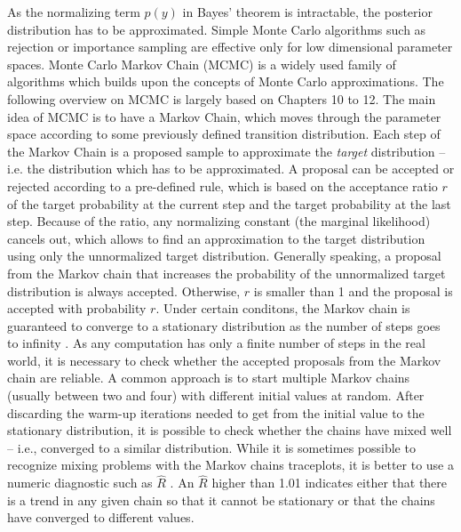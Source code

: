 As the normalizing term $p(y)$ in Bayes' theorem is intractable, the posterior distribution has to be approximated.
Simple Monte Carlo algorithms such as rejection or importance sampling are effective only for low dimensional parameter spaces.
Monte Carlo Markov Chain (MCMC) is a widely used family of algorithms which builds upon the concepts of Monte Carlo approximations.
The following overview on MCMC is largely based on \cite{gelman_bayesian_2014} Chapters 10 to 12.
The main idea of MCMC is to have a Markov Chain, which moves through the parameter space according to some previously defined transition distribution.
Each step of the Markov Chain is a proposed sample to approximate the \textit{target} distribution – i.e. the distribution which has to be approximated.
A proposal can be accepted or rejected according to a pre-defined rule, which is based on the acceptance ratio $r$ of the target probability at the current step and the target probability at the last step.
Because of the ratio, any normalizing constant (the marginal likelihood) cancels out, which allows to find an approximation to the target distribution using only the unnormalized target distribution.
Generally speaking, a proposal from the Markov chain that increases the probability of the unnormalized target distribution is always accepted.
Otherwise, $r$ is smaller than 1 and the proposal is accepted with probability $r$.
Under certain conditons, the Markov chain is guaranteed to converge to a stationary distribution as the number of steps goes to infinity \citep[Chapter 11]{gelman_bayesian_2014}.
As any computation has only a finite number of steps in the real world, it is necessary to check whether the accepted proposals from the Markov chain are reliable.
A common approach is to start multiple Markov chains (usually between two and four) with different initial values at random.
After discarding the warm-up iterations needed to get from the initial value to the stationary distribution, it is possible to check whether the chains have mixed well – i.e., converged to a similar distribution.
While it is sometimes possible to recognize mixing problems with the Markov chains traceplots, it is better to use a numeric diagnostic such as $\hat R$ \citep{vehtari_rank-normalization_2021}.
An $\hat R$ higher than 1.01 indicates either that there is a trend in any given chain so that it cannot be stationary or that the chains have converged to different values.


